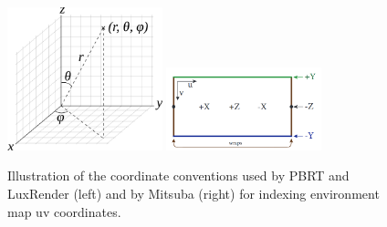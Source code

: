 \begin{figure}[h]
  \centering
  \includegraphics[width=0.4\textwidth,height=\textheight,keepaspectratio]{images/4_system_architecture/spherical_coordinates.png}
  \includegraphics[width=0.4\textwidth,height=\textheight,keepaspectratio]{images/4_system_architecture/mitdocemitter.png}
  \caption{Illustration of the coordinate conventions used by PBRT and LuxRender 
  (left) and by Mitsuba (right) for indexing environment map uv coordinates.}
  \label{fig:mitdocemitter}
\end{figure}


